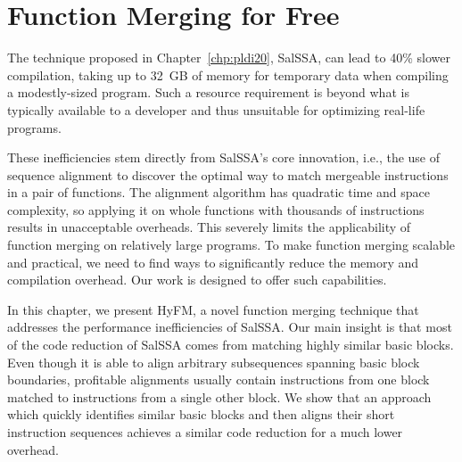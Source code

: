 
\chapter{Function Merging for Free} \label{chp:lctes21}


\renewcommand{\ProjName}{{HyFM}\xspace}
\newcommand{\SOAName}{{SalSSA}\xspace}
\newcommand{\NW}{{Needleman-Wunsch}\xspace}


The technique proposed in Chapter~\ref{chp:pldi20}, {\SOAName}, can lead to 40\% slower compilation, taking up to 32~GB of memory for temporary data when compiling a modestly-sized program.
Such a resource requirement is beyond what is typically available to a developer and thus unsuitable for optimizing real-life programs.

These inefficiencies stem directly from {\SOAName}'s core innovation, i.e., the use of sequence alignment to discover the optimal way to match mergeable instructions in a pair of functions.
The alignment algorithm has quadratic time and space complexity, so applying it on whole functions with thousands of instructions results in unacceptable overheads.
This severely limits the applicability of function merging on relatively large programs.
To make function merging scalable and practical, we need to find ways to significantly reduce the memory and compilation overhead. Our work is designed to offer such capabilities.   


In this chapter, we present \ProjName, a novel function merging technique that addresses the performance inefficiencies of \SOAName.
Our main insight is that most of the code reduction of {\SOAName} comes from matching highly similar basic blocks.
Even though it is able to align arbitrary subsequences spanning basic block boundaries, profitable alignments usually contain instructions from one block matched to instructions from a single other block.
We show that an approach which quickly identifies similar basic blocks and then aligns their short instruction sequences achieves a similar code reduction for a much lower overhead.

